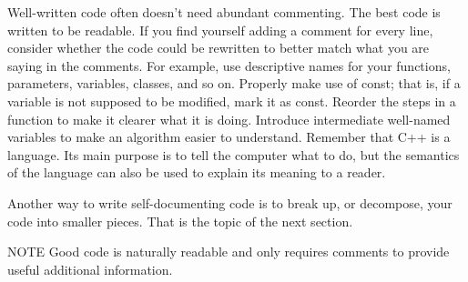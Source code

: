 
Well-written code often doesn’t need abundant commenting. The best code is written to be readable.
If you find yourself adding a comment for every line, consider whether the code could be rewritten to better match what you are saying in the comments. For example, use descriptive names for your functions, parameters, variables, classes, and so on. Properly make use of const; that is, if a variable is not supposed to be modified, mark it as const. Reorder the steps in a function to make it clearer what it is doing. Introduce intermediate well-named variables to make an algorithm easier to understand. Remember that C++ is a language. Its main purpose is to tell the computer what to do, but the semantics of the language can also be used to explain its meaning to a reader.

Another way to write self-documenting code is to break up, or decompose, your code into smaller pieces. That is the topic of the next section.

\begin{myNotic}{NOTE}
Good code is naturally readable and only requires comments to provide useful additional information.
\end{myNotic}




















